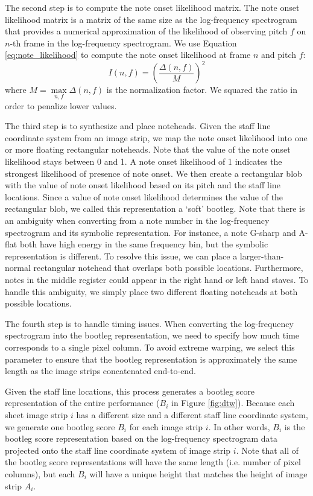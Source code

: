 \documentclass[letterpaper, 10pt, conference]{ieeeconf}  %
\begin{document}
The second step is to compute the note onset likelihood matrix. The note onset likelihood matrix is a matrix of the same size as the log-frequency spectrogram that provides a numerical approximation of the likelihood of observing pitch $f$ on $n$-th frame in the log-frequency spectrogram. We use Equation \ref{eq:note_likelihood} to compute the note onset likelihood at frame $n$ and pitch $f$:
\begin{equation}
    I(n,f) = \left(\frac{\Delta(n,f)}{M}\right)^2 
    \label{eq:note_likelihood}
\end{equation}
where $M = \max\limits_{n,f}\Delta(n,f)$ is the normalization factor. We squared the ratio in order to penalize lower values.

The third step is to synthesize and place noteheads. Given the staff line coordinate system from an image strip, we map the note onset likelihood into one or more floating rectangular noteheads. Note that the value of the note onset likelihood stays between 0 and 1. A note onset likelihood of 1 indicates the strongest likelihood of presence of note onset. We then create a rectangular blob with the value of note onset likelihood based on its pitch and the staff line locations. Since a value of note onset likelihood determines the value of the rectangular blob, we called this representation a `soft' bootleg. Note that there is an ambiguity when converting from a note number in the log-frequency spectrogram and its symbolic representation. For instance, a note G-sharp and A-flat both have high energy in the same frequency bin, but the symbolic representation is different. To resolve this issue, we can place a larger-than-normal rectangular notehead that overlaps both possible locations. Furthermore, notes in the middle register could appear in the right hand or left hand staves. To handle this ambiguity, we simply place two different floating noteheads at both possible locations.

The fourth step is to handle timing issues. When converting the log-frequency spectrogram into the bootleg representation, we need to specify how much time corresponds to a single pixel column. To avoid extreme warping, we select this parameter to ensure that the bootleg representation is approximately the same length as the image strips concatenated end-to-end.

Given the staff line locations, this process generates a bootleg score representation of the entire performance ($B_i$ in Figure \ref{fig:dtw}). Because each sheet image strip $i$ has a different size and a different staff line coordinate system, we generate one bootleg score $B_i$ for each image strip $i$. In other words, $B_i$ is the bootleg score representation based on the log-frequency spectrogram data projected onto the staff line coordinate system of image strip $i$. Note that all of the bootleg score representations will have the same length (i.e. number of pixel columns), but each $B_i$ will have a unique height that matches the height of image strip $A_i$.
\end{document}
